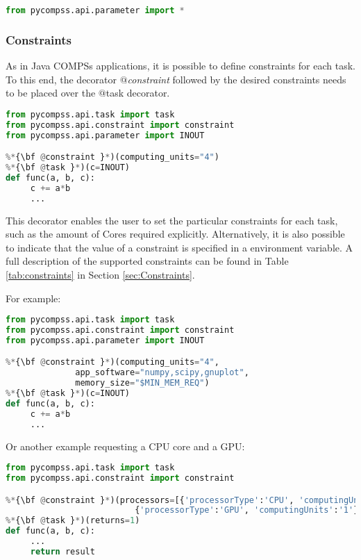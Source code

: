 \begin{lstlisting}[language=python]
from pycompss.api.parameter import *
\end{lstlisting}

\subsubsection{Constraints}
\label{subsubsec:constraints}

As in Java COMPSs applications, it is possible to define constraints for each task.
To this end, the decorator {\it $@$constraint} followed by the desired constraints needs to be placed over the $@$task decorator.

\begin{lstlisting}[language=python]
from pycompss.api.task import task
from pycompss.api.constraint import constraint
from pycompss.api.parameter import INOUT

%*{\bf @constraint }*)(computing_units="4")
%*{\bf @task }*)(c=INOUT)
def func(a, b, c):
     c += a*b
     ...
\end{lstlisting}

This decorator enables the user to set the particular constraints for each task, such as the amount of Cores required explicitly.
Alternatively, it is also possible to indicate that the value of a constraint is specified in a environment variable.
A full description of the supported constraints can be found in Table \ref{tab:constraints} in Section \ref{sec:Constraints}.

For example:

\begin{lstlisting}[language=python]
from pycompss.api.task import task
from pycompss.api.constraint import constraint
from pycompss.api.parameter import INOUT

%*{\bf @constraint }*)(computing_units="4", 
              app_software="numpy,scipy,gnuplot", 
              memory_size="$MIN_MEM_REQ")
%*{\bf @task }*)(c=INOUT)
def func(a, b, c):
     c += a*b
     ...
\end{lstlisting}

Or another example requesting a CPU core and a GPU:

\vspace{1.0cm}

\begin{lstlisting}[language=python]
from pycompss.api.task import task
from pycompss.api.constraint import constraint

%*{\bf @constraint }*)(processors=[{'processorType':'CPU', 'computingUnits':'1'},
                          {'processorType':'GPU', 'computingUnits':'1'}])
%*{\bf @task }*)(returns=1)
def func(a, b, c):
     ...
     return result
\end{lstlisting}

